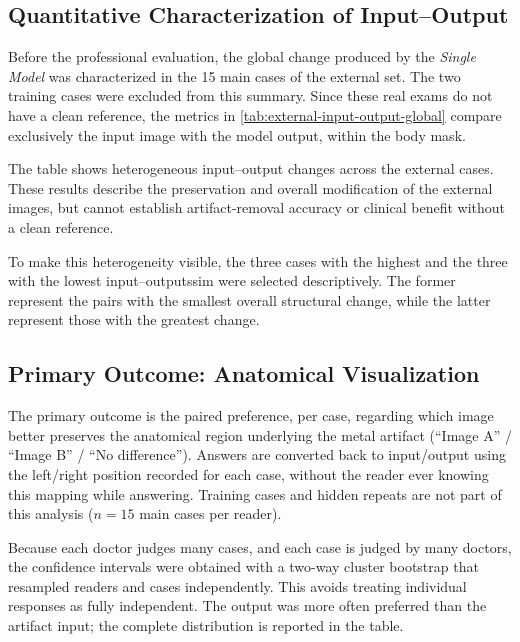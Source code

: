 \subsection{Quantitative Characterization of Input--Output}
Before the professional evaluation, the global change produced by the \textit{Single Model} was characterized in the 15 main cases of the external set. The two training cases were excluded from this summary. Since these real exams do not have a clean reference, the metrics in \autoref{tab:external-input-output-global} compare exclusively the input image with the model output, within the body mask.



The table shows heterogeneous input--output changes across the external cases. These results describe the preservation and overall modification of the external images, but cannot establish artifact-removal accuracy or clinical benefit without a clean reference.

To make this heterogeneity visible, the three cases with the highest and the three with the lowest input--output\acrshort{ssim} were selected descriptively. The former represent the pairs with the smallest overall structural change, while the latter represent those with the greatest change.



\FloatBarrier
\subsection{Primary Outcome: Anatomical Visualization}

The primary outcome is the paired preference, per case, regarding which image better preserves the anatomical region underlying the metal artifact (``Image A'' / ``Image B'' / ``No difference''). Answers are converted back to input/output using the left/right position recorded for each case, without the reader ever knowing this mapping while answering. Training cases and hidden repeats are not part of this analysis ($n=15$ main cases per reader).

Because each doctor judges many cases, and each case is judged by many doctors, the confidence intervals were obtained with a two-way cluster bootstrap that resampled readers and cases independently. This avoids treating individual responses as fully independent. The output was more often preferred than the artifact input; the complete distribution is reported in the table.

